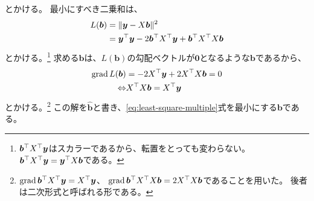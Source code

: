 とかける。
最小にすべき二乗和は、
\begin{equation}\label{eq:least-square-multiple}
	\begin{split}
		L(\bm{b}) & = \| \bm{y}  - X\bm{b} \|^2                                                                     \\
		          & = \bm{y}^{\top} \bm{y} - 2 \bm{b}^{\top} X^{\top} \bm{y} + \bm{b}^{\top} X^{\top} X \bm{b}
	\end{split}
\end{equation}
とかける。\footnote{
	$\bm{b}^{\top}X^{\top}\bm{y}$はスカラーであるから、転置をとっても変わらない。
	$\bm{b}^{\top}X^{\top}\bm{y} = \bm{y}^{\top}X\bm{b}$である。
}
求める$\bm{b}$は、$L(\bm{b})$の勾配ベクトルが$\bm{0}$となるような$\bm{b}$であるから、
\begin{equation}\label{eq:normal-equation-multiple}
	\begin{split}
		\mathrm{grad}\,L(\bm{b}) & = -2X^{\top}\bm{y} + 2X^{\top}X\bm{b} = 0 \\
		\Leftrightarrow  & X^{\top}X\bm{b} = X^{\top}\bm{y}
	\end{split}
\end{equation}
とかける。\footnote{
	$\mathrm{grad}\,\bm{b}^{\top}X^{\top}\bm{y} = X^{\top}\bm{y}$、
	$\mathrm{grad}\,\bm{b}^{\top}X^{\top}X\bm{b} = 2X^{\top}X\bm{b}$であることを用いた。
	後者は二次形式と呼ばれる形である。
}
この解を$\bm{\hat{b}}$と書き、\ref{eq:least-square-multiple}式を最小にする$\bm{b}$である。


